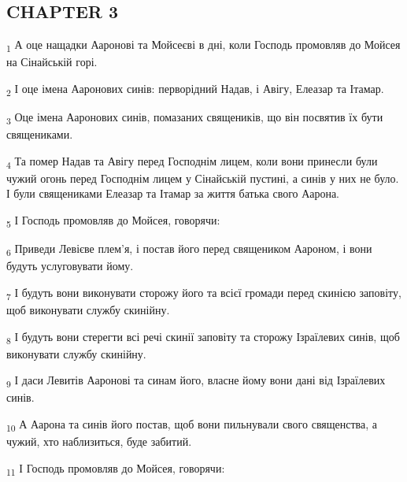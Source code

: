 \subsection{CHAPTER 3}
\begin{tcolorbox}
\textsubscript{1} А оце нащадки Ааронові та Мойсеєві в дні, коли Господь промовляв до Мойсея на Сінайській горі.
\end{tcolorbox}
\begin{tcolorbox}
\textsubscript{2} І оце імена Ааронових синів: перворідний Надав, і Авігу, Елеазар та Ітамар.
\end{tcolorbox}
\begin{tcolorbox}
\textsubscript{3} Оце імена Ааронових синів, помазаних священиків, що він посвятив їх бути священиками.
\end{tcolorbox}
\begin{tcolorbox}
\textsubscript{4} Та помер Надав та Авігу перед Господнім лицем, коли вони принесли були чужий огонь перед Господнім лицем у Сінайській пустині, а синів у них не було. І були священиками Елеазар та Ітамар за життя батька свого Аарона.
\end{tcolorbox}
\begin{tcolorbox}
\textsubscript{5} І Господь промовляв до Мойсея, говорячи:
\end{tcolorbox}
\begin{tcolorbox}
\textsubscript{6} Приведи Левієве плем'я, і постав його перед священиком Аароном, і вони будуть услуговувати йому.
\end{tcolorbox}
\begin{tcolorbox}
\textsubscript{7} І будуть вони виконувати сторожу його та всієї громади перед скинією заповіту, щоб виконувати службу скинійну.
\end{tcolorbox}
\begin{tcolorbox}
\textsubscript{8} І будуть вони стерегти всі речі скинії заповіту та сторожу Ізраїлевих синів, щоб виконувати службу скинійну.
\end{tcolorbox}
\begin{tcolorbox}
\textsubscript{9} І даси Левитів Ааронові та синам його, власне йому вони дані від Ізраїлевих синів.
\end{tcolorbox}
\begin{tcolorbox}
\textsubscript{10} А Аарона та синів його постав, щоб вони пильнували свого священства, а чужий, хто наблизиться, буде забитий.
\end{tcolorbox}
\begin{tcolorbox}
\textsubscript{11} І Господь промовляв до Мойсея, говорячи:
\end{tcolorbox}
